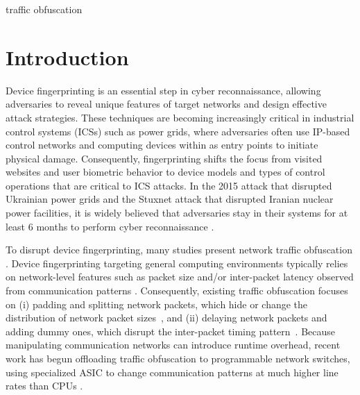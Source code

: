 \documentclass[conference]{IEEEtran}
\begin{document}
\begin{IEEEkeywords}
traffic obfuscation
\end{IEEEkeywords}

\section{Introduction}
\label{sec:intro}

Device fingerprinting is an essential step in cyber reconnaissance, allowing adversaries to reveal unique features of target networks and design effective attack strategies. These techniques are becoming increasingly critical in industrial control systems (ICSs) such as power grids, where adversaries often use IP-based control networks and computing devices within as entry points to initiate physical damage. Consequently, fingerprinting shifts the focus from visited websites and user biometric behavior to device models and types of control operations that are critical to ICS attacks. In the 2015 attack that disrupted Ukrainian power grids and the Stuxnet attack that disrupted Iranian nuclear power facilities, it is widely believed that adversaries stay in their systems for at least 6 months to perform cyber reconnaissance \cite{ukraine2015, stuxnet2011}. 



To disrupt device fingerprinting, many studies present network traffic obfuscation \cite{wright2009, dyer2012}. Device fingerprinting targeting general computing environments typically relies on network-level features such as packet size and/or inter-packet latency observed from communication patterns \cite{sirinam2018}. Consequently, existing traffic obfuscation focuses on (i) padding and splitting network packets, which hide or change the distribution of network packet sizes~\cite{wright2009}, and (ii) delaying network packets and adding dummy ones, which disrupt the inter-packet timing pattern~\cite{dyer2012, tamaraw2014}. Because manipulating communication networks can introduce runtime overhead, recent work has begun offloading traffic obfuscation to programmable network switches, using specialized ASIC to change communication patterns at much higher line rates than CPUs \cite{ditto2022, minos2025,securitas2026}. 
\end{document}
